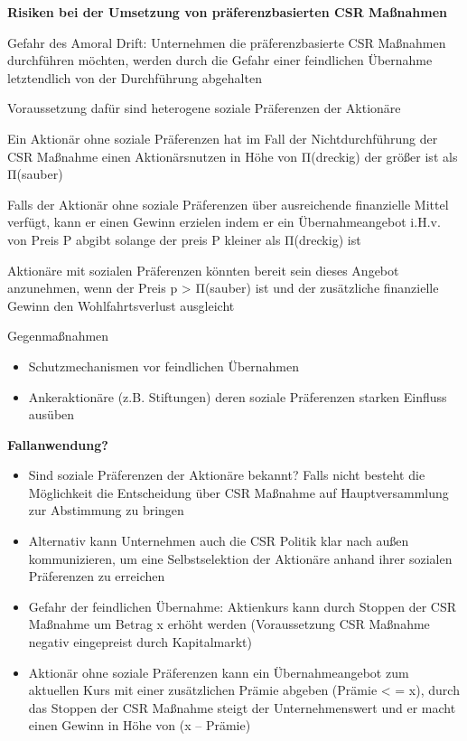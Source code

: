 \documentclass[
]{article}
\providecommand{\tightlist}{%
  \setlength{\itemsep}{0pt}\setlength{\parskip}{0pt}}
\begin{document}
\textbf{Risiken bei der Umsetzung von präferenzbasierten CSR Maßnahmen}

Gefahr des Amoral Drift: Unternehmen die präferenzbasierte CSR Maßnahmen
durchführen möchten, werden durch die Gefahr einer feindlichen Übernahme
letztendlich von der Durchführung abgehalten

Voraussetzung dafür sind heterogene soziale Präferenzen der Aktionäre

Ein Aktionär ohne soziale Präferenzen hat im Fall der Nichtdurchführung
der CSR Maßnahme einen Aktionärsnutzen in Höhe von Π(dreckig) der größer
ist als Π(sauber)

Falls der Aktionär ohne soziale Präferenzen über ausreichende
finanzielle Mittel verfügt, kann er einen Gewinn erzielen indem er ein
Übernahmeangebot i.H.v. von Preis P abgibt solange der preis P kleiner
als Π(dreckig) ist

Aktionäre mit sozialen Präferenzen könnten bereit sein dieses Angebot
anzunehmen, wenn der Preis p \textgreater{} Π(sauber) ist und der
zusätzliche finanzielle Gewinn den Wohlfahrtsverlust ausgleicht

Gegenmaßnahmen

\begin{itemize}
\tightlist
\item
  Schutzmechanismen vor feindlichen Übernahmen
\item
  Ankeraktionäre (z.B. Stiftungen) deren soziale Präferenzen starken
  Einfluss ausüben
\end{itemize}

\textbf{Fallanwendung?}

\begin{itemize}
\tightlist
\item
  Sind soziale Präferenzen der Aktionäre bekannt? Falls nicht besteht
  die Möglichkeit die Entscheidung über CSR Maßnahme auf
  Hauptversammlung zur Abstimmung zu bringen
\item
  Alternativ kann Unternehmen auch die CSR Politik klar nach außen
  kommunizieren, um eine Selbstselektion der Aktionäre anhand ihrer
  sozialen Präferenzen zu erreichen
\item
  Gefahr der feindlichen Übernahme: Aktienkurs kann durch Stoppen der
  CSR Maßnahme um Betrag x erhöht werden (Voraussetzung CSR Maßnahme
  negativ eingepreist durch Kapitalmarkt)
\item
  Aktionär ohne soziale Präferenzen kann ein Übernahmeangebot zum
  aktuellen Kurs mit einer zusätzlichen Prämie abgeben (Prämie
  \textless{} = x), durch das Stoppen der CSR Maßnahme steigt der
  Unternehmenswert und er macht einen Gewinn in Höhe von (x -- Prämie)
\end{itemize}
\end{document}
